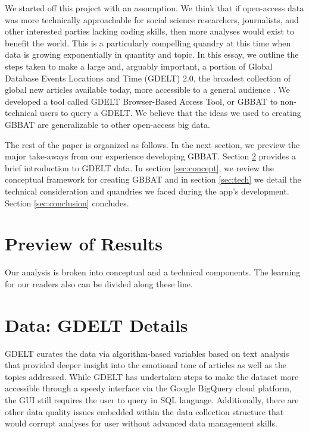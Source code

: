 \documentclass[preprint,authoryear,12pt]{elsarticle/elsarticle}
\begin{document}
We started off this project with an assumption. We think that if open-access data was more technically approachable for social science researchers, journalists, and other interested parties lacking coding skills, then more analyses would exist to benefit the world. This is a particularly compelling quandry at this time when data is growing exponentially in quantity and topic. In this essay, we outline the steps taken to make a large and, arguably important, a portion of Global Database Events Locations and Time (GDELT) 2.0,  the broadest collection of global new articles available today, more accessible to a general audience \citep{GDELT2015, GDELT2020}. We developed a tool called GDELT Browser-Based Access Tool, or GBBAT to non-technical users to query a GDELT. We believe that the ideas we used to creating GBBAT are generalizable to other open-access big data.  

The rest of the paper is organized as follows. In the next section, we preview the major take-aways from our experience developing GBBAT. Section \ref{sec:data} provides a brief introduction to GDELT data. In section \ref{sec:concept}, we review the conceptual framework for creating GBBAT and in section \ref{sec:tech} we detail the technical consideration and quandries we faced during the app's development. Section \ref{sec:conclusion} concludes.

\section{Preview of Results}
\label{sec:preview}
Our analysis is broken into conceptual and a technical components. The learning for our readers also can be divided along these line.  

\section{Data: GDELT Details}
\label{sec:data}

GDELT curates the data via algorithm-based variables based on text analysis that provided deeper insight into the emotional tone of articles as well as the topics addressed. While GDELT has undertaken steps to make the dataset more accessible through a speedy interface via the Google BigQuery cloud platform, the GUI still requires the user to query in SQL language. Additionally, there are other data quality issues embedded within the data collection structure that would corrupt analyses for user without advanced data management skills. 
\end{document}
